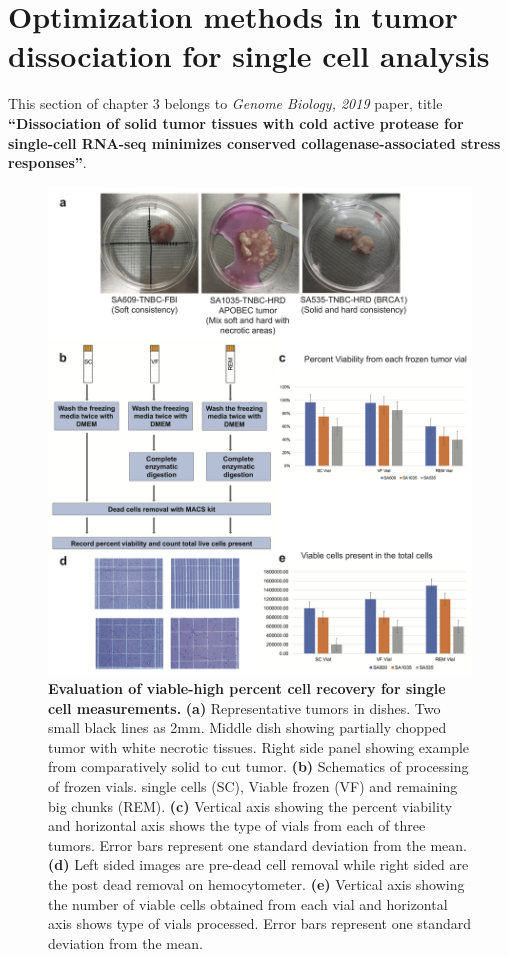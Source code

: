\section{Optimization methods in tumor dissociation for single cell analysis}

This section of chapter 3 belongs to \textit{Genome Biology, 2019} paper, title  \textbf{``Dissociation of solid tumor tissues with cold active protease for single-cell RNA-seq minimizes conserved collagenase-associated stress responses''}.

\begin{figure}
	\centering
	\includegraphics[width=\textwidth]{Figures/chap3/cellviability2.png}
	\caption[Evaluation of viable-high percent cell recovery for single cell measurements]
	{\small
	    \textbf{Evaluation of viable-high percent cell recovery for single cell measurements.}
	    \textbf{(a)} Representative tumors in dishes. Two small black lines as 2mm. Middle dish showing partially chopped tumor with white necrotic tissues. Right side panel showing example from comparatively solid to cut tumor.
	    \textbf{(b)} Schematics of processing of frozen vials. single cells (SC), Viable frozen (VF) and remaining big chunks (REM).
	    \textbf{(c)} Vertical axis showing the percent viability and horizontal axis shows the type of vials from each of three tumors. Error bars represent one standard deviation from the mean.  \textbf{(d)} Left sided images are pre-dead cell removal while right sided are the post dead removal on hemocytometer. \textbf{(e)} Vertical axis showing the number of viable cells obtained from each vial and horizontal axis shows type of vials processed. Error bars represent one standard deviation from the mean.
	}
	\label{fig:cellviability}
\end{figure}
